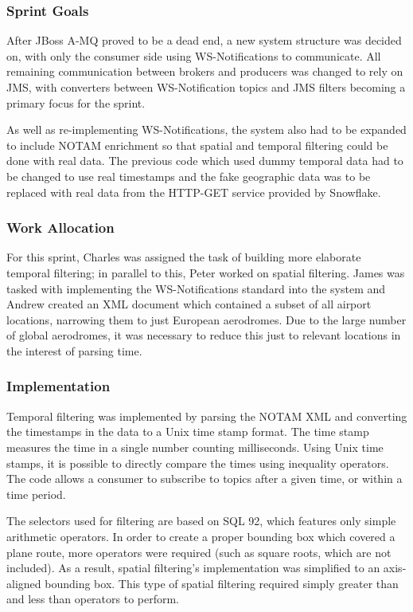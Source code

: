 \documentclass[a4paper, 12pt, twoside]{article}
\begin{document}
\subsubsection{Sprint Goals}

After JBoss A-MQ proved to be a dead end, a new system structure was decided on, with only the consumer side using WS-Notifications to communicate. All remaining communication between brokers and producers was changed to rely on JMS, with converters between WS-Notification topics and JMS filters becoming a primary focus for the sprint.

As well as re-implementing WS-Notifications, the system also had to be expanded to include NOTAM enrichment so that spatial and temporal filtering could be done with real data. The previous code which used dummy temporal data had to be changed to use real timestamps and the fake geographic data was to be replaced with real data from the HTTP-GET service provided by Snowflake.

\subsubsection{Work Allocation}

For this sprint, Charles was assigned the task of building more elaborate temporal filtering; in parallel to this, Peter worked on spatial filtering. James was tasked with implementing the WS-Notifications standard into the system and Andrew created an XML document which contained a subset of all airport locations, narrowing them to just European aerodromes. Due to the large number of global aerodromes, it was necessary to reduce this just to relevant locations in the interest of parsing time.

\subsubsection{Implementation}

Temporal filtering was implemented by parsing the NOTAM XML and converting the timestamps in the data to a Unix time stamp format. The time stamp measures the time in a single number counting milliseconds. Using Unix time stamps, it is possible to directly compare the times using inequality operators. The code allows a consumer to subscribe to topics after a given time, or within a time period.

The selectors used for filtering are based on SQL 92, which features only simple arithmetic operators. In order to create a proper bounding box which covered a plane route, more operators were required (such as square roots, which are not included). As a result, spatial filtering's implementation was simplified to an axis-aligned bounding box. This type of spatial filtering required simply greater than and less than operators to perform.
\end{document}
